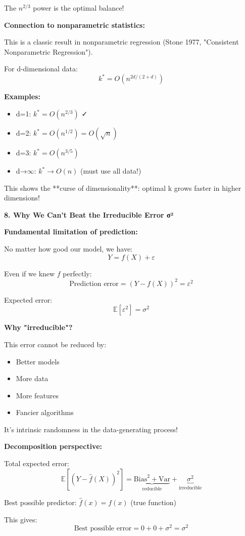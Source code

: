 \documentclass[12pt]{article}
\begin{document}
\begin{explanation}
The $n^{2/3}$ power is the optimal balance!

\textbf{Connection to nonparametric statistics:}

This is a classic result in nonparametric regression (Stone 1977, "Consistent Nonparametric Regression").

For d-dimensional data:
\[
k^* = O(n^{2d/(2+d)})
\]

\textbf{Examples:}
\begin{itemize}
    \item d=1: $k^* = O(n^{2/3})$ ✓
    \item d=2: $k^* = O(n^{1/2}) = O(\sqrt{n})$
    \item d=3: $k^* = O(n^{3/5})$
    \item d→$\infty$: $k^* \to O(n)$ (must use all data!)
\end{itemize}

This shows the **curse of dimensionality**: optimal k grows faster in higher dimensions!

\textbf{8. Why We Can't Beat the Irreducible Error σ²}

\textbf{Fundamental limitation of prediction:}

No matter how good our model, we have:
\[
Y = f(X) + \varepsilon
\]

Even if we knew $f$ perfectly:
\[
\text{Prediction error} = (Y - f(X))^2 = \varepsilon^2
\]

Expected error:
\[
\mathbb{E}[\varepsilon^2] = \sigma^2
\]

\textbf{Why "irreducible"?}

This error cannot be reduced by:
\begin{itemize}
    \item Better models
    \item More data
    \item More features
    \item Fancier algorithms
\end{itemize}

It's intrinsic randomness in the data-generating process!

\textbf{Decomposition perspective:}

Total expected error:
\[
\mathbb{E}[(Y - \hat{f}(X))^2] = \underbrace{\text{Bias}^2 + \text{Var}}_{\text{reducible}} + \underbrace{\sigma^2}_{\text{irreducible}}
\]

Best possible predictor: $\hat{f}(x) = f(x)$ (true function)

This gives:
\[
\text{Best possible error} = 0 + 0 + \sigma^2 = \sigma^2
\]


\end{explanation}
\end{document}
